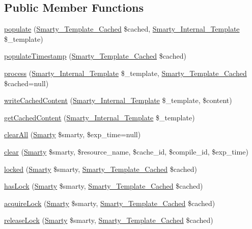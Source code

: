 \subsection*{Public Member Functions}
\begin{DoxyCompactItemize}
\item 
\hyperlink{class_smarty___cache_resource_a397dea1ffad6f2ff9111ef7218cea345}{populate} (\hyperlink{class_smarty___template___cached}{Smarty\+\_\+\+Template\+\_\+\+Cached} \$cached, \hyperlink{class_smarty___internal___template}{Smarty\+\_\+\+Internal\+\_\+\+Template} \$\+\_\+template)
\item 
\hyperlink{class_smarty___cache_resource_a4722beac1ad0bb6c485476c9d77f294b}{populate\+Timestamp} (\hyperlink{class_smarty___template___cached}{Smarty\+\_\+\+Template\+\_\+\+Cached} \$cached)
\item 
\hyperlink{class_smarty___cache_resource_a019b4a8966896231cabceac0f073d7d0}{process} (\hyperlink{class_smarty___internal___template}{Smarty\+\_\+\+Internal\+\_\+\+Template} \$\+\_\+template, \hyperlink{class_smarty___template___cached}{Smarty\+\_\+\+Template\+\_\+\+Cached} \$cached=null)
\item 
\hyperlink{class_smarty___cache_resource_af18c2dd2d421b8de6847db415fcb2a7c}{write\+Cached\+Content} (\hyperlink{class_smarty___internal___template}{Smarty\+\_\+\+Internal\+\_\+\+Template} \$\+\_\+template, \$content)
\item 
\hyperlink{class_smarty___cache_resource_aa645ec746221da5b60c967f399bc814f}{get\+Cached\+Content} (\hyperlink{class_smarty___internal___template}{Smarty\+\_\+\+Internal\+\_\+\+Template} \$\+\_\+template)
\item 
\hyperlink{class_smarty___cache_resource_a116dae666984bacbc85ba9ee69dff1d7}{clear\+All} (\hyperlink{class_smarty}{Smarty} \$smarty, \$exp\+\_\+time=null)
\item 
\hyperlink{class_smarty___cache_resource_a03b181c51244030a1173478514367b86}{clear} (\hyperlink{class_smarty}{Smarty} \$smarty, \$resource\+\_\+name, \$cache\+\_\+id, \$compile\+\_\+id, \$exp\+\_\+time)
\item 
\hyperlink{class_smarty___cache_resource_a25d360bf9084e5f54e9dad94697b3a3c}{locked} (\hyperlink{class_smarty}{Smarty} \$smarty, \hyperlink{class_smarty___template___cached}{Smarty\+\_\+\+Template\+\_\+\+Cached} \$cached)
\item 
\hyperlink{class_smarty___cache_resource_a8ea21dba853364366abd58fe9a6b9bd1}{has\+Lock} (\hyperlink{class_smarty}{Smarty} \$smarty, \hyperlink{class_smarty___template___cached}{Smarty\+\_\+\+Template\+\_\+\+Cached} \$cached)
\item 
\hyperlink{class_smarty___cache_resource_a7d1ce76cfa7371aa4e27f88ed1289460}{acquire\+Lock} (\hyperlink{class_smarty}{Smarty} \$smarty, \hyperlink{class_smarty___template___cached}{Smarty\+\_\+\+Template\+\_\+\+Cached} \$cached)
\item 
\hyperlink{class_smarty___cache_resource_ac606c17f197b801c9c9df1b184f34910}{release\+Lock} (\hyperlink{class_smarty}{Smarty} \$smarty, \hyperlink{class_smarty___template___cached}{Smarty\+\_\+\+Template\+\_\+\+Cached} \$cached)
\end{DoxyCompactItemize}
